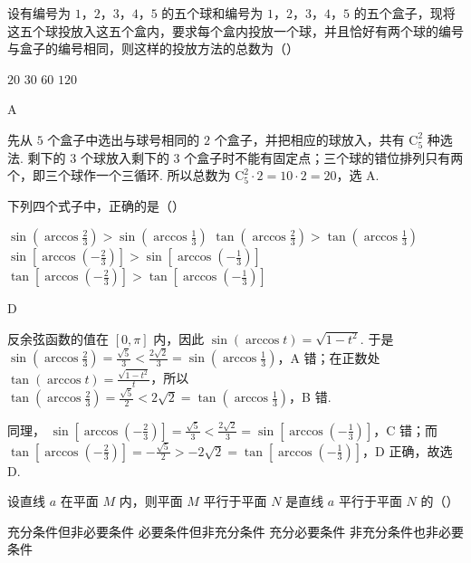 \begin{problem}
设有编号为 \(1\)，\(2\)，\(3\)，\(4\)，\(5\) 的五个球和编号为 \(1\)，\(2\)，\(3\)，\(4\)，\(5\) 的五个盒子，现将这五个球投放入这五个盒内，要求每个盒内投放一个球，并且恰好有两个球的编号与盒子的编号相同，则这样的投放方法的总数为（\quad）

\choices
    {\(20\)}
    {\(30\)}
    {\(60\)}
    {\(120\)}
\end{problem}

\begin{answer}
A
\end{answer}

\begin{solution}
先从 \(5\) 个盒子中选出与球号相同的 \(2\) 个盒子，并把相应的球放入，共有 \(\mathrm C_5^2\) 种选法. 剩下的 \(3\) 个球放入剩下的 \(3\) 个盒子时不能有固定点；三个球的错位排列只有两个，即三个球作一个三循环. 所以总数为
\(\mathrm C_5^2\cdot2=10\cdot2=20\)，选 A.
\end{solution}

\begin{problem}
下列四个式子中，正确的是（\quad）

\choices
    {\(\sin\left(\arccos \frac{2}{3}\right) > \sin\left(\arccos \frac{1}{3}\right)\)}
    {\(\tan\left(\arccos \frac{2}{3}\right) > \tan\left(\arccos \frac{1}{3}\right)\)}
    {\(\sin\left[\arccos\left(-\frac{2}{3}\right)\right] > \sin\left[\arccos\left(-\frac{1}{3}\right)\right]\)}
    {\(\tan\left[\arccos\left(-\frac{2}{3}\right)\right] > \tan\left[\arccos\left(-\frac{1}{3}\right)\right]\)}
\end{problem}

\begin{answer}
D
\end{answer}

\begin{solution}
反余弦函数的值在 \([0,\pi]\) 内，因此
\(\sin(\arccos t)=\sqrt{1-t^2}\). 于是
\(\sin(\arccos\frac23)=\frac{\sqrt5}{3}<\frac{2\sqrt2}{3}=\sin(\arccos\frac13)\)，A 错；在正数处
\(\tan(\arccos t)=\frac{\sqrt{1-t^2}}{t}\)，所以
\(\tan(\arccos\frac23)=\frac{\sqrt5}{2}<2\sqrt2=\tan(\arccos\frac13)\)，B 错.

同理，
\(\sin[\arccos(-\frac23)]=\frac{\sqrt5}{3}<\frac{2\sqrt2}{3}=\sin[\arccos(-\frac13)]\)，C 错；而
\(\tan[\arccos(-\frac23)]=-\frac{\sqrt5}{2}>-2\sqrt2=\tan[\arccos(-\frac13)]\)，D 正确，故选 D.
\end{solution}

\begin{problem}
设直线 \(a\) 在平面 \(M\) 内，则平面 \(M\) 平行于平面 \(N\) 是直线 \(a\) 平行于平面 \(N\) 的（\quad）

\choices
    {充分条件但非必要条件}
    {必要条件但非充分条件}
    {充分必要条件}
    {非充分条件也非必要条件}
\end{problem}

